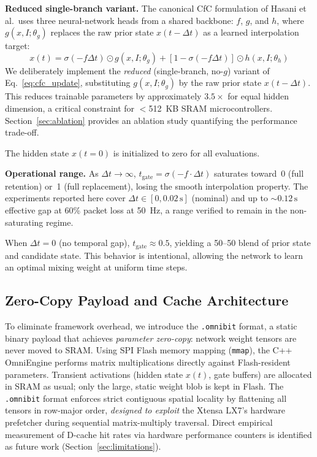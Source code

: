 \documentclass[conference]{IEEEtran}
\newcommand{\xt}{x(t)}
\newcommand{\xprev}{x(t-\Delta t)}
\newcommand{\dt}{\Delta t}
\newcommand{\tgate}{t_{\text{gate}}}
\begin{document}
\textbf{Reduced single-branch variant.}\quad
The canonical CfC formulation of Hasani et al.\ uses three neural-network
heads from a shared backbone: $f$, $g$, and $h$, where $g(x,I;\theta_g)$
replaces the raw prior state $\xprev$ as a learned interpolation target:
\begin{equation}
  \xt = \sigma(-f\dt) \odot g(x,I;\theta_g)
      + [1-\sigma(-f\dt)] \odot h(x,I;\theta_h)
  \label{eq:cfc_full}
\end{equation}
We deliberately implement the \emph{reduced} (single-branch, no-$g$)
variant of Eq.~\eqref{eq:cfc_update}, substituting $g(x,I;\theta_g)$ by the
raw prior state $\xprev$. This reduces trainable parameters by approximately
$3.5\times$ for equal hidden dimension, a critical constraint for
$<$512~KB SRAM microcontrollers. Section~\ref{sec:ablation} provides an
ablation study quantifying the performance trade-off.

The hidden state $x(t{=}0)$ is initialized to zero for all evaluations.

\textbf{Operational range.}\quad
As $\dt \to \infty$, $\tgate = \sigma(-f \cdot \dt)$ saturates toward~0
(full retention) or~1 (full replacement), losing the smooth interpolation
property. The experiments reported here cover $\dt \in [0, 0.02\,\text{s}]$
(nominal) and up to $\sim\!0.12\,\text{s}$ effective gap at 60\% packet loss
at 50~Hz, a range verified to remain in the non-saturating regime.

When $\dt = 0$ (no temporal gap), $\tgate \approx 0.5$, yielding a
50--50 blend of prior state and candidate state. This behavior is
intentional, allowing the network to learn an optimal mixing weight at
uniform time steps.

\subsection{Zero-Copy Payload and Cache Architecture}
To eliminate framework overhead, we introduce the \texttt{.omnibit} format, a
static binary payload that achieves \emph{parameter zero-copy}: network weight
tensors are never moved to SRAM. Using SPI Flash memory mapping
(\texttt{mmap}), the C++ OmniEngine performs matrix multiplications directly
against Flash-resident parameters. Transient activations (hidden state $\xt$,
gate buffers) are allocated in SRAM as usual; only the large, static weight
blob is kept in Flash.
The \texttt{.omnibit} format enforces strict contiguous spatial locality by
flattening all tensors in row-major order, \emph{designed to exploit} the
Xtensa LX7's hardware prefetcher during sequential matrix-multiply traversal.
Direct empirical measurement of D-cache hit rates via hardware performance
counters is identified as future work (Section~\ref{sec:limitations}).
\end{document}

